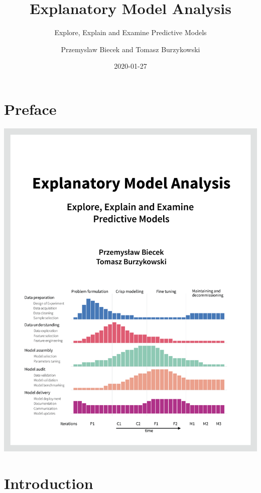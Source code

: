 \documentclass[12pt,]{krantz}
\title{Explanatory Model Analysis}
\subtitle{Explore, Explain and Examine Predictive Models}
\author{Przemyslaw Biecek and Tomasz Burzykowski}
\date{2020-01-27}
\begin{document}
\maketitle

{
\hypersetup{linkcolor=black}
\setcounter{tocdepth}{2}
\tableofcontents
}
\listoftables
\listoffigures
\hypertarget{preface}{%
\section*{Preface}\label{preface}}

\begin{center}\includegraphics[width=0.99\linewidth]{figure/front} \end{center}

\hypertarget{introduction}{%
\section{Introduction}\label{introduction}}
\end{document}
